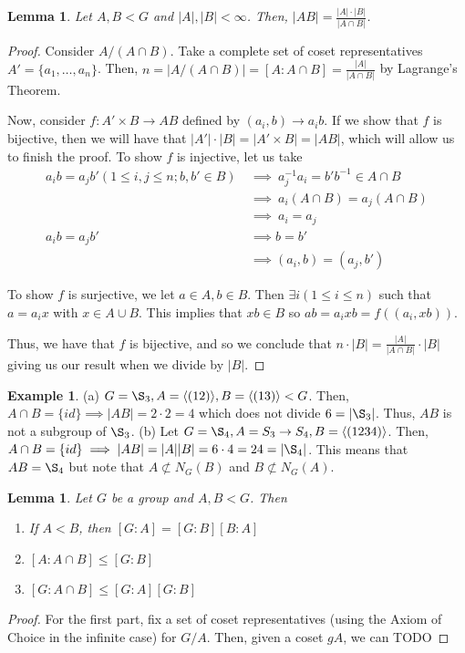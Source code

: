 \documentclass[11pt,leqno,oneside]{amsart}
\newcommand{\subgroup}{\mathrel{<}}
\newtheorem{lem}[thm]{Lemma}
\theoremstyle{definition}
\newtheorem{example}[thm]{Example}
\numberwithin{equation}{section}
\begin{document}
    \begin{lem}
        Let $A,B \subgroup G$ and $|A|, |B| < \infty$. Then, $|AB| = \frac{|A| \cdot |B|}{|A \cap B|}$.
    \end{lem}
    \begin{proof}
        Consider $A/(A \cap B)$. Take a complete set of coset representatives $A' = \{a_1, \ldots, a_n\}$. Then, $n = |A/(A \cap B)| = [A : A \cap B] = \frac{|A|}{|A \cap B|}$ by Lagrange's Theorem.

        Now, consider $f: A' \times B \to AB$ defined by $(a_i,b) \to a_ib$. If
        we show that $f$ is bijective, then we will have that $|A'| \cdot |B| =
        |A' \times B| = |AB|$, which will allow us to finish the proof.
        To show $f$ is injective, let us take \begin{align*}
            a_ib = a_jb' (1 \leq i,j \leq n; b,b' \in B) & \ \implies \ a_j^{-1} a_i = b'b^{-1} \in A\cap B\\
            \ & \ \implies \ a_i(A \cap B) = a_j(A \cap B) \\
            \ & \ \implies \ a_i = a_j \\
            a_ib = a_jb' & \ \implies b = b' \\
            \ & \ \implies (a_i, b) = (a_j, b')
        \end{align*}

        To show $f$ is surjective, we let $a \in A, b \in B$. Then $\exists i
        (1 \leq i \leq n)$ such that $a=a_ix$ with $x \in A \cup B$. This
        implies that $xb \in B$ so $ab = a_ixb = f( (a_i,xb) )$.

        Thus, we have that $f$ is bijective, and so we conclude that $n \cdot
        |B| = \frac{|A|}{|A \cap B|} \cdot |B|$ giving us our result when we
        divide by $|B|$.
    \end{proof}
    \begin{example}
        (a) $G = \S_3, A = \langle (12) \rangle, B = \langle (13) \rangle
        \subgroup G$. Then, $A \cap B = \{ id \} \implies |AB| = 2 \cdot 2 = 4$
        which does not divide $6 = |\S_3|$. Thus, $AB$ is not a subgroup of
        $\S_3$.
        (b) Let $G=\S_4, A = S_3 \to S_4, B = \langle (1234) \rangle$. Then, $A \cap B = \{id\} \implies |AB| = |A||B| = 6 \cdot 4 = 24 = |\S_4|$. This means that $AB = \S_4$ but note that $A \not\subset N_G(B)$ and $B \not\subset N_G(A)$.
    \end{example}
    \begin{lem}
        Let $G$ be a group and $A,B \subgroup G$. Then
        \begin{enumerate}
            \item If $A \subgroup B$, then $[G:A] = [G:B][B:A]$
            \item $[A: A \cap B] \leq [G:B]$
            \item $[G: A \cap B] \leq [G:A][G:B]$
        \end{enumerate}
    \end{lem}
    \begin{proof}
       For the first part, fix a set of coset representatives (using the Axiom of Choice in the infinite case) for $G/A$. Then, given a coset $gA$, we can TODO
\end{proof}
\end{document}
